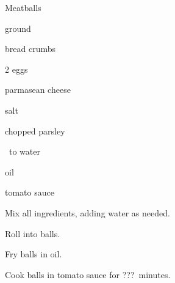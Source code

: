 \begin{recipe}{Meatballs}{}{}

\begin{ingredients}
\item {} ground 
\item \lbs{\half} bread crumbs
\item 2 eggs
\item {} parmasean cheese
\item salt
\item chopped parsley
\item \quarter\ to \C{\half} water
\item oil
\item tomato sauce
\end{ingredients}

\begin{directions}
\item Mix all ingredients, adding water as needed.
\item Roll into balls.
\item Fry balls in oil.
\item Cook balls in tomato sauce for ???~minutes.
\end{directions}
\end{recipe}
